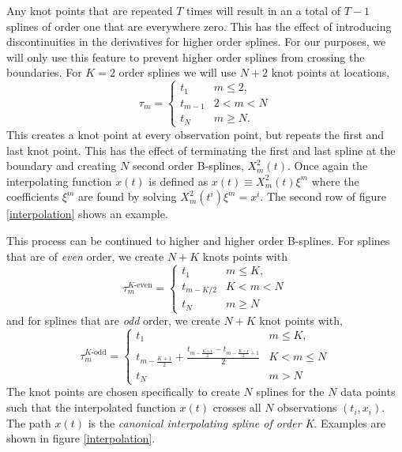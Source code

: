 \documentclass[10pt,journal]{IEEEtran}
\begin{document}
Any knot points that are repeated $T$ times will result in an a total of $T-1$ splines of order one that are everywhere zero. This has the effect of introducing discontinuities in the derivatives for higher order splines. For our purposes, we will only use this feature to prevent higher order splines from crossing the boundaries. For $K=2$ order splines we will use $N+2$ knot points at locations,
\begin{equation}
\tau_m = \begin{cases}
t_1      	& \text{$m \leq 2$}, \\
t_{m-1}	& \text{$2 < m < N$}\\
t_N 		& \text{$m \geq N$}.
\end{cases}
\end{equation}
This creates a knot point at every observation point, but repeats the first and last knot point. This has the effect of terminating the first and last spline at the boundary and creating $N$ second order B-splines, $X^2_m(t)$. Once again the interpolating function $x(t)$ is defined as $x(t) \equiv  X^2_m(t) \xi^m$ where the coefficients $\xi^m$ are found by solving $X^2_m(t^i) \xi^m = x^i$. The second row of figure \ref{interpolation} shows an example.

This process can be continued to higher and higher order B-splines. For splines that are of \emph{even} order, we create $N+K$ knots points with
\begin{equation}
\tau_m^{\text{$K$-even}} = \begin{cases}
t_1      	& \text{$m \leq K$}, \\
t_{m-K/2}	& \text{$K < m < N$}\\
t_N 		& \text{$m \geq N$}
\end{cases}
\label{even-knots}
\end{equation}
and for splines that are \emph{odd} order, we create $N+K$ knot points with,
\begin{equation}
\tau_m^{\text{$K$-odd}} = \begin{cases}
t_1      	& \text{$m \leq K$}, \\
t_{m-\frac{K+1}{2}} + \frac{t_{m-\frac{K+1}{2}}-t_{m-\frac{K+1}{2}+1}}{2}	& \text{$K < m \leq N$}\\
t_N 		& \text{$m > N$}
\end{cases}
\label{odd-knots}
\end{equation}
The knot points are chosen specifically to create $N$ splines for the $N$ data points such that the interpolated function $x(t)$ crosses all $N$ observations $(t_i,x_i)$. The path $x(t)$ is the \emph{canonical interpolating spline of order K}. Examples are shown in figure \ref{interpolation}.
\end{document}
